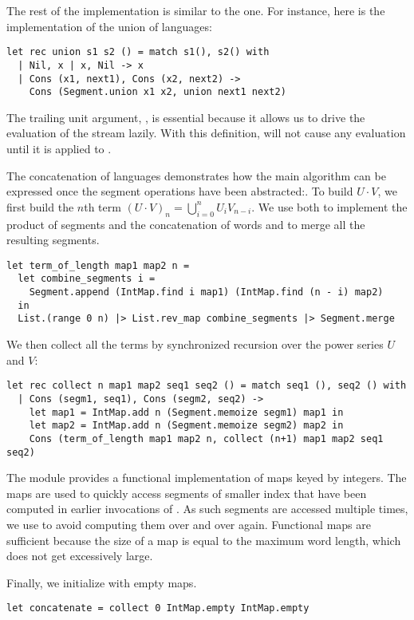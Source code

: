 The rest of the implementation is similar to the \haskell one. For instance,
here is the implementation of the union of languages:
\begin{lstlisting}
let rec union s1 s2 () = match s1(), s2() with
  | Nil, x | x, Nil -> x
  | Cons (x1, next1), Cons (x2, next2) -> 
    Cons (Segment.union x1 x2, union next1 next2)
\end{lstlisting}
The trailing unit argument, \code{()}, is essential because it allows
us to drive the evaluation of the stream lazily. With this definition, 
will not cause  any evaluation until it is applied to \code{()}.

The concatenation of languages demonstrates how the main algorithm can
be expressed once the segment operations have been abstracted:.
To build $U \cdot V$, we first build the $n$th term
$(U \cdot V)_n = \bigcup_{i=0}^n U_i V_{n-i}$.
We use both  to implement the product
of segments and the concatenation of words and  to merge
all the resulting segments.
\begin{lstlisting}
let term_of_length map1 map2 n =
  let combine_segments i =
    Segment.append (IntMap.find i map1) (IntMap.find (n - i) map2)
  in
  List.(range 0 n) |> List.rev_map combine_segments |> Segment.merge
\end{lstlisting}

We then collect all the terms by synchronized recursion over the power series $U$
and $V$:
\begin{lstlisting}
let rec collect n map1 map2 seq1 seq2 () = match seq1 (), seq2 () with
  | Cons (segm1, seq1), Cons (segm2, seq2) ->
    let map1 = IntMap.add n (Segment.memoize segm1) map1 in 
    let map2 = IntMap.add n (Segment.memoize segm2) map2 in
    Cons (term_of_length map1 map2 n, collect (n+1) map1 map2 seq1 seq2)
\end{lstlisting}

The  module provides a functional implementation of maps
keyed by integers. The maps are used to quickly access
segments of smaller index that have been computed in earlier invocations of
. As such segments are accessed
multiple times, we use  to avoid computing them over and
over again.
Functional maps are sufficient because the size of a map is equal
to the maximum word length, which does not get excessively large.

Finally, we initialize  with empty maps.
\begin{lstlisting}[numbers=none]
let concatenate = collect 0 IntMap.empty IntMap.empty
\end{lstlisting}

